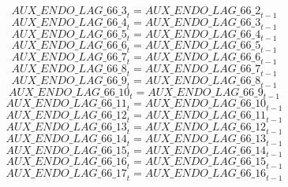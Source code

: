 \begin{dmath}
{AUX\_ENDO\_LAG\_66\_3}_{t}={AUX\_ENDO\_LAG\_66\_2}_{t-1}
\end{dmath}
\begin{dmath}
{AUX\_ENDO\_LAG\_66\_4}_{t}={AUX\_ENDO\_LAG\_66\_3}_{t-1}
\end{dmath}
\begin{dmath}
{AUX\_ENDO\_LAG\_66\_5}_{t}={AUX\_ENDO\_LAG\_66\_4}_{t-1}
\end{dmath}
\begin{dmath}
{AUX\_ENDO\_LAG\_66\_6}_{t}={AUX\_ENDO\_LAG\_66\_5}_{t-1}
\end{dmath}
\begin{dmath}
{AUX\_ENDO\_LAG\_66\_7}_{t}={AUX\_ENDO\_LAG\_66\_6}_{t-1}
\end{dmath}
\begin{dmath}
{AUX\_ENDO\_LAG\_66\_8}_{t}={AUX\_ENDO\_LAG\_66\_7}_{t-1}
\end{dmath}
\begin{dmath}
{AUX\_ENDO\_LAG\_66\_9}_{t}={AUX\_ENDO\_LAG\_66\_8}_{t-1}
\end{dmath}
\begin{dmath}
{AUX\_ENDO\_LAG\_66\_10}_{t}={AUX\_ENDO\_LAG\_66\_9}_{t-1}
\end{dmath}
\begin{dmath}
{AUX\_ENDO\_LAG\_66\_11}_{t}={AUX\_ENDO\_LAG\_66\_10}_{t-1}
\end{dmath}
\begin{dmath}
{AUX\_ENDO\_LAG\_66\_12}_{t}={AUX\_ENDO\_LAG\_66\_11}_{t-1}
\end{dmath}
\begin{dmath}
{AUX\_ENDO\_LAG\_66\_13}_{t}={AUX\_ENDO\_LAG\_66\_12}_{t-1}
\end{dmath}
\begin{dmath}
{AUX\_ENDO\_LAG\_66\_14}_{t}={AUX\_ENDO\_LAG\_66\_13}_{t-1}
\end{dmath}
\begin{dmath}
{AUX\_ENDO\_LAG\_66\_15}_{t}={AUX\_ENDO\_LAG\_66\_14}_{t-1}
\end{dmath}
\begin{dmath}
{AUX\_ENDO\_LAG\_66\_16}_{t}={AUX\_ENDO\_LAG\_66\_15}_{t-1}
\end{dmath}
\begin{dmath}
{AUX\_ENDO\_LAG\_66\_17}_{t}={AUX\_ENDO\_LAG\_66\_16}_{t-1}
\end{dmath}
